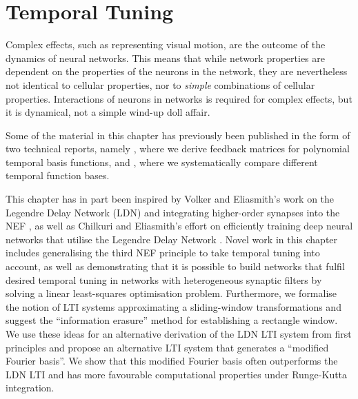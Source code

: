\chapter{Temporal Tuning}
\label{chp:temporal_tuning}

\vspace{20pt}

\begin{OpeningQuote}
Complex effects, such as representing visual motion, are the outcome of the dynamics of neural networks. This means that while network properties are dependent on the properties of the neurons in the network, they are nevertheless not identical to cellular properties, nor to \emph{simple} combinations of cellular properties. Interactions of neurons in networks is required for complex effects, but it is dynamical, not a simple wind-up doll affair.
\end{OpeningQuote}

\begin{PriorPublication}
Some of the material in this chapter has previously been published in the form of two technical reports, namely \citet{stockel2021constructing}, where we derive feedback matrices for polynomial temporal basis functions, and \citet{stockel2021discrete}, where we systematically compare different temporal function bases.
\end{PriorPublication}

\begin{Contributions}
This chapter has in part been inspired by Volker and Eliasmith's work on the Legendre Delay Network (LDN) and integrating higher-order synapses into the NEF \citep{voelker2018improving,voelker2019}, as well as Chilkuri and Eliasmith's effort on efficiently training deep neural networks that utilise the Legendre Delay Network \citep{chilkuri2021parallelizing}.
Novel work in this chapter includes generalising the third NEF principle to take temporal tuning into account, as well as demonstrating that it is possible to build networks that fulfil desired temporal tuning in networks with heterogeneous synaptic filters by solving a linear least-squares optimisation problem.
Furthermore, we formalise the notion of LTI systems approximating a sliding-window transformations and suggest the \enquote{information erasure} method for establishing a rectangle window.
We use these ideas for an alternative derivation of the LDN LTI system from first principles and propose an alternative LTI system that generates a \enquote{modified Fourier basis}.
We show that this modified Fourier basis often outperforms the LDN LTI and has more favourable computational properties under Runge-Kutta integration.
\end{Contributions}

